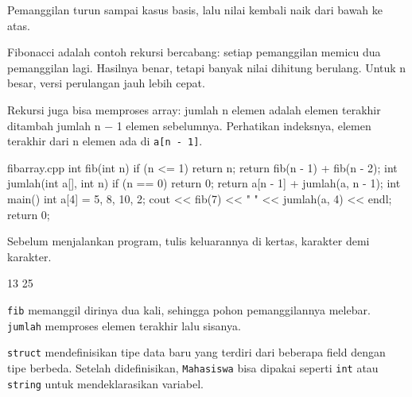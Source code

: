 \documentclass[a4paper]{article}
\begin{document}
\par\vspace{4pt}\par\vspace{6pt}
\begin{Penting}[]
Pemanggilan turun sampai kasus basis, lalu nilai kembali naik dari bawah ke atas.
\end{Penting}
Fibonacci adalah contoh rekursi bercabang: setiap pemanggilan memicu dua pemanggilan lagi. Hasilnya benar, tetapi banyak nilai dihitung berulang. Untuk n besar, versi perulangan jauh lebih cepat.

Rekursi juga bisa memproses array: jumlah n elemen adalah elemen terakhir ditambah jumlah n − 1 elemen sebelumnya. Perhatikan indeksnya, elemen terakhir dari n elemen ada di \texttt{a[n - 1]}.

\begin{MKode}{fibarray.cpp}
int fib(int n) {
    if (n <= 1) return n;
    return fib(n - 1) + fib(n - 2);
}
int jumlah(int a[], int n) {
    if (n == 0) return 0;
    return a[n - 1] + jumlah(a, n - 1);
}
int main() {
    int a[4] = {5, 8, 10, 2};
    cout << fib(7) << " " << jumlah(a, 4) << endl;
    return 0;
}
\end{MKode}
\begin{Tebak}[]
Sebelum menjalankan program, tulis keluarannya di kertas, karakter demi karakter.
\end{Tebak}
\begin{Jawaban}[]
\begin{MKeluaran}[]
13 25
\end{MKeluaran}
\texttt{fib} memanggil dirinya dua kali, sehingga pohon pemanggilannya melebar. \texttt{jumlah} memproses elemen terakhir lalu sisanya.
\end{Jawaban}
\texttt{struct} mendefinisikan tipe data baru yang terdiri dari beberapa field dengan tipe berbeda. Setelah didefinisikan, \texttt{Mahasiswa} bisa dipakai seperti \texttt{int} atau \texttt{string} untuk mendeklarasikan variabel.
\end{document}
